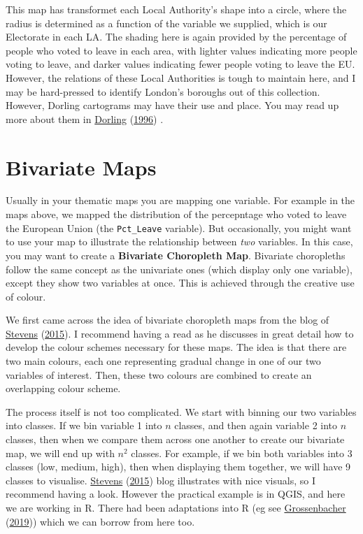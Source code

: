 \documentclass[
]{book}
\begin{document}
This map has transformet each Local Authority's shape into a circle, where the radius is determined as a function of the variable we supplied, which is our Electorate in each LA. The shading here is again provided by the percentage of people who voted to leave in each area, with lighter values indicating more people voting to leave, and darker values indicating fewer people voting to leave the EU. However, the relations of these Local Authorities is tough to maintain here, and I may be hard-pressed to identify London's boroughs out of this collection. However, Dorling cartograms may have their use and place. You may read up more about them in \protect\hyperlink{ref-Dorling_1996}{Dorling} (\protect\hyperlink{ref-Dorling_1996}{1996}) .

\hypertarget{bivariate-maps}{%
\section{Bivariate Maps}\label{bivariate-maps}}

Usually in your thematic maps you are mapping one variable. For example in the maps above, we mapped the distribution of the percepntage who voted to leave the European Union (the \texttt{Pct\_Leave} variable). But occasionally, you might want to use your map to illustrate the relationship between \emph{two} variables. In this case, you may want to create a \textbf{Bivariate Choropleth Map}. Bivariate choropleths follow the same concept as the univariate ones (which display only one variable), except they show two variables at once. This is achieved through the creative use of colour.

We first came across the idea of bivariate choropleth maps from the blog of \protect\hyperlink{ref-Stevens_2015}{Stevens} (\protect\hyperlink{ref-Stevens_2015}{2015}). I recommend having a read as he discusses in great detail how to develop the colour schemes necessary for these maps. The idea is that there are two main colours, each one representing gradual change in one of our two variables of interest. Then, these two colours are combined to create an overlapping colour scheme.

The process itself is not too complicated. We start with binning our two variables into classes. If we bin variable 1 into \(n\) classes, and then again variable 2 into \(n\) classes, then when we compare them across one another to create our bivariate map, we will end up with \(n^2\) classes. For example, if we bin both variables into 3 classes (low, medium, high), then when displaying them together, we will have 9 classes to visualise. \protect\hyperlink{ref-Stevens_2015}{Stevens} (\protect\hyperlink{ref-Stevens_2015}{2015}) blog illustrates with nice visuals, so I recommend having a look. However the practical example is in QGIS, and here we are working in R. There had been adaptations into R (eg see \protect\hyperlink{ref-Grossenbacher_2019}{Grossenbacher} (\protect\hyperlink{ref-Grossenbacher_2019}{2019})) which we can borrow from here too.
\end{document}
